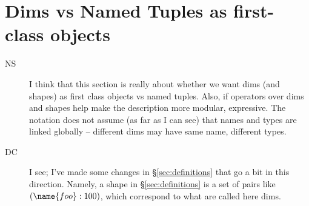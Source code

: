 
\makeatletter
\newcommand{\namestack}[1]{%
  \def\dolist##1{\expandafter\@dolist##1,\@eol}%
  \def\@dolist##1,##2\@eol{%
    \begingroup\setbox0=\hbox{##1\unskip}\ifdim\wd0=0pt\endgroup\else\endgroup\name{\ignorespaces##1\unskip}\fi%
    \ifx\@eol##2\@eol\else\\\@dolist##2\@eol\fi}%
  \substack{\dolist{#1}}%
}
\makeatother


\section{Dims vs Named Tuples as first-class objects}
\label{sec:tsalib}

\begin{description}
\item[NS] I think that this section is really about whether we want dims (and shapes) as first class objects vs named tuples. Also, if operators over dims and shapes help make the description more modular, expressive. The notation does not assume (as far as I can see) that names and types are linked globally -- different dims may have same name, different types.
\item[DC] I see; I've made some changes in \S\ref{sec:definitions} that go a bit in this direction. Namely, a shape in \S\ref{sec:definitions} is a set of pairs like $(\name{foo}:100)$, which correspond to what are called here dims.
\end{description}

